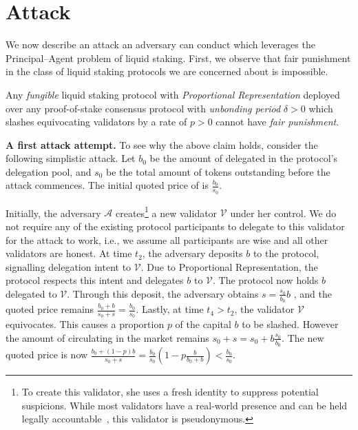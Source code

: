 \section{Attack}

We now describe an attack an adversary can conduct which leverages the
Principal--Agent problem of liquid staking. First, we observe that
fair punishment in the class of liquid staking protocols we are concerned
about is impossible.

\begin{claim}
Any \emph{fungible} liquid staking protocol with \emph{Proportional Representation}
deployed over any proof-of-stake consensus protocol with \emph{unbonding period}
$\delta > 0$ which slashes equivocating validators by a rate of $p > 0$
cannot have \emph{fair punishment}.
\end{claim}

\noindent
\textbf{A first attack attempt.}
To see why the above claim holds, consider the following simplistic attack.
Let $b_0$ be the amount of delegated \asset in the protocol's delegation pool,
and $s_0$ be the total amount of \stasset tokens outstanding
before the attack commences. The initial quoted price of \stasset
is $\frac{b_0}{s_0}$.

Initially,
the adversary $\mathcal{A}$ creates\footnote{To create this validator, she uses a fresh identity
to suppress potential suspicions. While most validators
have a real-world presence and can be held legally
accountable~\cite{liquid-staking-report}, this validator is pseudonymous.}
a new validator $\mathcal{V}$ under her control.
We do not require any of the existing protocol participants to delegate
to this validator for the attack to work, i.e., we assume all participants
are wise and all other validators are honest.
At time $t_2$, the adversary deposits $b$ \asset to the protocol,
signalling delegation intent to $\mathcal{V}$.
Due to Proportional Representation,
the protocol respects this intent and delegates $b$ \asset to $\mathcal{V}$.
The protocol now holds $b$ delegated \asset to $\mathcal{V}$.
Through this deposit, the adversary obtains
$s = \frac{s_0}{b_0} b$ \stasset, and the quoted price remains
$\frac{b_0 + b}{s_0 + s} = \frac{b_0}{s_0}$.
Lastly, at time $t_4 > t_2$, the validator
$\mathcal{V}$ equivocates. This causes a proportion $p$ of
the capital $b$ to be slashed.
However the amount of \stasset circulating in the
market remains $s_0 + s = s_0 + b\frac{s_0}{b_0}$.
The new quoted price is now
$\frac{b_0 + (1 - p)b}{s_0 + s} = \frac{b_0}{s_0}(1 - p\frac{b}{b_0 + b}) < \frac{b_0}{s_0}$.

